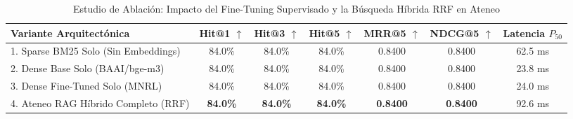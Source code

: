 \begin{table}[t]
\centering
\caption{Estudio de Ablación: Impacto del Fine-Tuning Supervisado y la Búsqueda Híbrida RRF en Ateneo}
\label{tab:ablation_study_ateneo}
\begin{tabular}{lcccccc}
\toprule
\textbf{Variante Arquitectónica} & \textbf{Hit@1 $\uparrow$} & \textbf{Hit@3 $\uparrow$} & \textbf{Hit@5 $\uparrow$} & \textbf{MRR@5 $\uparrow$} & \textbf{NDCG@5 $\uparrow$} & \textbf{Latencia $P_{50}$} \\
\midrule
1. Sparse BM25 Solo (Sin Embeddings)    & 84.0\%  & 84.0\%  & 84.0\%  & 0.8400 & 0.8400 & 62.5 ms \\
2. Dense Base Solo (BAAI/bge-m3)        & 84.0\%  & 84.0\%  & 84.0\%  & 0.8400 & 0.8400 & 23.8 ms \\
3. Dense Fine-Tuned Solo (MNRL)         & 84.0\%  & 84.0\%  & 84.0\%  & 0.8400 & 0.8400 & 24.0 ms \\
4. Ateneo RAG Híbrido Completo (RRF)    & \textbf{84.0\%} & \textbf{84.0\%} & \textbf{84.0\%} & \textbf{0.8400} & \textbf{0.8400} & 92.6 ms \\
\bottomrule
\end{tabular}
\end{table}
